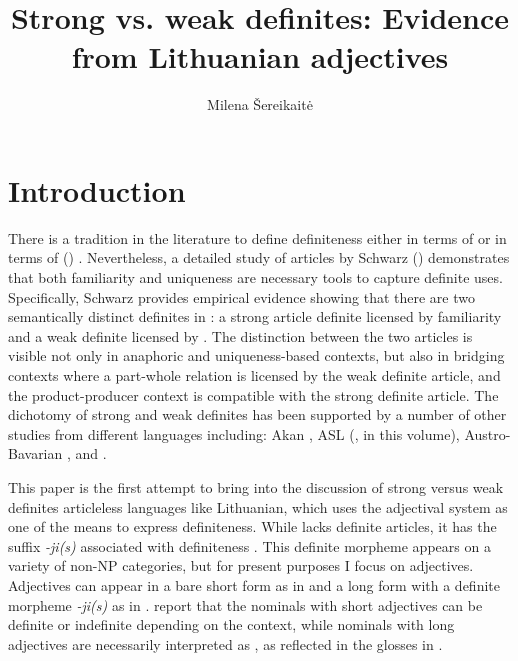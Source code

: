 \documentclass[output=paper,
modfonts
]{langscibook}
\title{Strong vs. weak definites: Evidence from Lithuanian adjectives}
\author{Milena \v{S}ereikaitė \affiliation{University of Pennsylvania} 
}
\begin{document}
\maketitle

\section{Introduction} 
There is a tradition in the literature to define definiteness either in terms of  \citep{Russell1905,Strawson1950,Frege1892,} or in terms of  () \citep{Christophersen1939,Kamp1981,Heim1982}. Nevertheless, a detailed study of  articles by Schwarz (\citeyear{Schwarz2009}) demonstrates that both familiarity and uniqueness are necessary tools to capture definite uses. Specifically, Schwarz provides empirical evidence showing that there are two semantically distinct definites in : a strong article definite licensed by familiarity and a weak definite licensed by . The distinction between the two articles is visible not only in anaphoric and uniqueness-based contexts, but also in bridging contexts where a part-whole relation is licensed by the weak definite article, and the product-producer context is compatible with the strong definite article. The dichotomy of strong and weak definites has been supported by a number of other studies from different languages including: Akan \citep{ArkohMatthewson2013}, ASL (\citealt{Irani2017}, in this volume), Austro-Bavarian \citep{Simonenko2014}, and  \citep{Ingason2016}.

This paper is the first attempt to bring into the discussion of strong versus weak definites articleless languages like Lithuanian, which uses the adjectival system as one of the means to express definiteness. While  lacks definite articles, it has the suffix \textit{-ji(s)} associated with definiteness \citep{Ambrazas1997}. This definite morpheme appears on a variety of non-NP categories, but for present purposes I focus on adjectives. Adjectives can appear in a bare short form as in  and a long form with a definite morpheme \textit{-ji(s)} as in . \citet{GillonArmoskaite2015} report that the nominals with short adjectives can be definite or indefinite depending on the context, while nominals with long adjectives are necessarily interpreted as , as reflected in the glosses in .  
\end{document}
